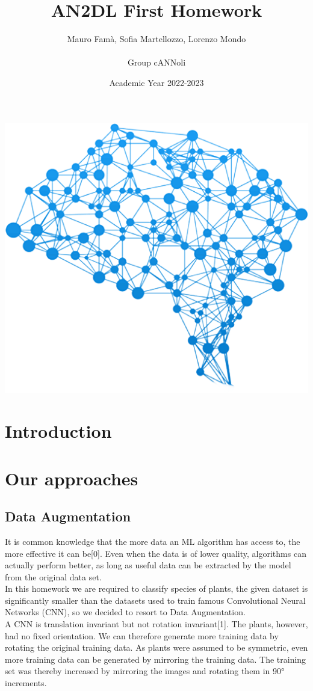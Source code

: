 \documentclass[11pt, oneside]{article}
\title{{\arial AN2DL First Homework}}
\author{{\calibri Mauro Famà,   Sofia Martellozzo,   Lorenzo Mondo\\ \\
        Group cANNoli}}
\date{Academic Year 2022-2023}
\begin{document}
\maketitle
\begin{center}
    \includegraphics[scale=0.43]{images/title.png}
\end{center}
\newpage
\vspace{.25in}


\section{Introduction}
\section{Our approaches}
\subsection{Data Augmentation}
It is common knowledge that the more data an ML algorithm has access to, the more effective it can be[0]. Even when the data is of lower quality, algorithms can actually perform better, as long as useful data can be extracted by the model from the original data set.\\
In this homework we are required to classify species of plants, the given dataset is significantly smaller than the datasets used to train famous Convolutional Neural Networks (CNN), so we decided to resort to Data Augmentation. \\
A CNN is translation invariant but not rotation invariant[1]. The plants, however, had no fixed orientation. We can therefore generate more training data by rotating the original training data. As plants were assumed to be symmetric, even more training data can be generated by mirroring the training data. The training set was thereby increased by mirroring the images and rotating them in 90° increments. 
\end{document}
